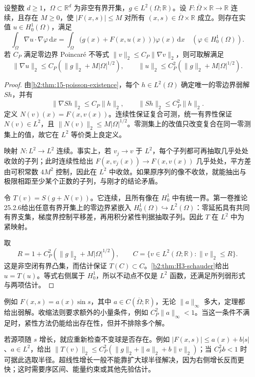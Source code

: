 \begin{theorem}[有界非线性源的弱解]
\label{b2:thm:H3-semilinear-bounded}
设整数 \(d\ge1\)，\(\Omega\subset\mathbb R^d\) 为非空有界开集，\(g\in L^2(\Omega;\mathbb R)\)。设 \(F:\overline\Omega\times\mathbb R\to\mathbb R\) 连续，且存在 \(M\ge0\)，使 \(|F(x,s)|\le M\) 对所有 \((x,s)\in\overline\Omega\times\mathbb R\) 成立。则存在实值 \(u\in H_0^1(\Omega)\)，满足
\[
 \int_\Omega\nabla u\cdot\nabla\varphi\,\mathrm dx
 =\int_\Omega\bigl(g(x)+F(x,u(x))\bigr)\varphi(x)\,\mathrm dx
 \quad(\varphi\in H_0^1(\Omega)).
\]
若 \(C_P\) 满足零边界 Poincaré 不等式 \(\|v\|_2\le C_P\|\nabla v\|_2\)，则可取解满足
\[
 \|\nabla u\|_2\le C_P(\|g\|_2+M|\Omega|^{1/2}),\qquad
 \|u\|_2\le C_P^2(\|g\|_2+M|\Omega|^{1/2}).
\]
\end{theorem}
\begin{proof}
由\cref{b2:thm:15-poisson-existence}，每个 \(h\in L^2(\Omega)\) 确定唯一的零边界弱解 \(Sh\)，并有
\[
 \|\nabla Sh\|_2\le C_P\|h\|_2,
 \qquad \|Sh\|_2\le C_P^2\|h\|_2.
\]
定义 \(N(v)(x)=F(x,v(x))\)。连续性保证复合可测，统一有界性保证 \(N(v)\in L^2\)，且 \(\|N(v)\|_2\le M|\Omega|^{1/2}\)。零测集上的改值只改变复合在同一零测集上的值，故它在 \(L^2\) 等价类上良定义。

映射 \(N:L^2\to L^2\) 连续。事实上，若 \(v_j\to v\) 于 \(L^2\)，每个子列都可再抽取几乎处处收敛的子列；此时连续性给出 \(F(x,v_j(x))\to F(x,v(x))\) 几乎处处，平方差由可积常数 \(4M^2\) 控制，因此在 \(L^2\) 中收敛。如果原序列的像不收敛，就能抽出与极限相距至少某个正数的子列，与刚才的结论矛盾。

令 \(T(v)=S(g+N(v))\)。它连续，且所有像在 \(H_0^1\) 中有统一界。第一卷推论25.2.6给出任意有界开集上的零边界紧嵌入 \(H_0^1(\Omega)\hookrightarrow L^2(\Omega)\)：零延拓具有共同有界支集，梯度界控制平移差，再用积分紧性判据抽取子列。因此 \(T\) 在 \(L^2\) 中为紧映射。

取
\[
 R=1+C_P^2(\|g\|_2+M|\Omega|^{1/2}),\qquad
 C=\{v\in L^2(\Omega;\mathbb R):\|v\|_2\le R\}.
\]
这是非空闭有界凸集，而估计保证 \(T(C)\subset C\)。\cref{b2:thm:H3-schauder}给出 \(u=T(u)\)。等式右侧属于 \(H_0^1\)，所以不动点不仅是 \(L^2\) 函数，还满足所列弱形式与两项估计。
\end{proof}

例如 \(F(x,s)=a(x)\sin s\)，其中 \(a\in C(\overline\Omega;\mathbb R)\)，无论 \(\|a\|_\infty\) 多大，定理都给出弱解。收缩法则要求额外的小量条件，例如 \(C_P^2\|a\|_\infty<1\)。当这一条件不满足时，紧性方法仍能给出存在性，但并不排除多个解。

\ProseParagraphBreak
若源项随 \(s\) 增长，就应重新检查不变球是否存在。例如 \(|F(x,s)|\le a(x)+b|s|\)、\(a\in L^2\)，给出 \(\|T(v)\|_2\le C_P^2(\|g\|_2+\|a\|_2+b\|v\|_2)\)；当 \(C_P^2b<1\) 时可据此选取半径。超线性增长一般不能靠扩大球半径解决，因为右侧增长反而更快；这时需要序区间、能量约束或其他先验估计。
